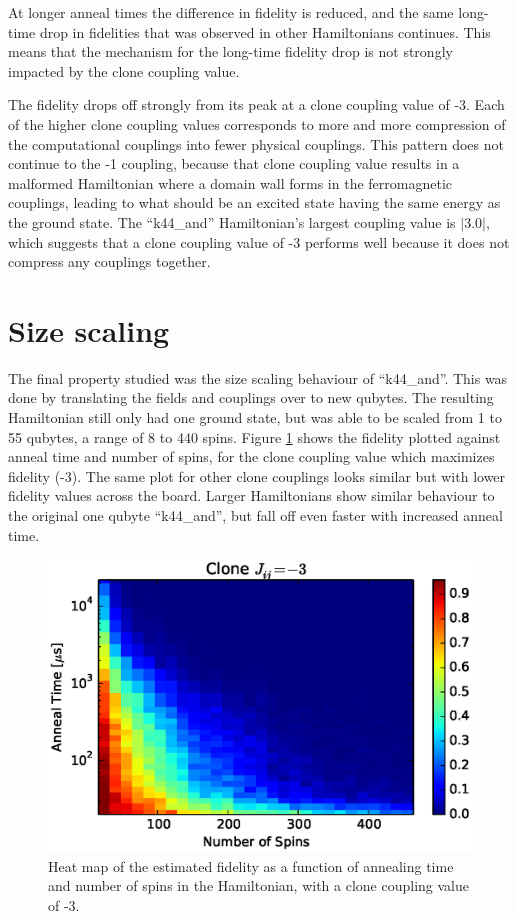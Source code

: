 At longer anneal times the difference in fidelity is reduced, and the same long-time drop in fidelities that was observed in other Hamiltonians continues.  This means that the mechanism for the long-time fidelity drop is not strongly impacted by the clone coupling value.

The fidelity drops off strongly from its peak at a clone coupling value of -3.  Each of the higher clone coupling values corresponds to more and more compression of the computational couplings into fewer physical couplings.  This pattern does not continue to the -1 coupling, because that clone coupling value results in a malformed Hamiltonian where a domain wall forms in the ferromagnetic couplings, leading to what should be an excited state having the same energy as the ground state.  The ``k44\_and'' Hamiltonian's largest coupling value is $|3.0|$, which suggests that a clone coupling value of -3 performs well because it does not compress any couplings together.

\section{Size scaling}
The final property studied was the size scaling behaviour of ``k44\_and''.  This was done by translating the fields and couplings over to new qubytes.  The resulting Hamiltonian still only had one ground state, but was able to be scaled from 1 to 55 qubytes, a range of 8 to 440 spins.  Figure \ref{fig:time_spins} shows the fidelity plotted against anneal time and number of spins, for the clone coupling value which maximizes fidelity (-3).  The same plot for other clone couplings looks similar but with lower fidelity values across the board.  Larger Hamiltonians show similar behaviour to the original one qubyte ``k44\_and'', but fall off even faster with increased anneal time.

\begin{figure}
	\includegraphics{img/pcolor_c_3.eps}
	\caption[Fidelity vs Time vs Number of Qubits]{Heat map of the estimated fidelity as a function of annealing time and number of spins in the Hamiltonian, with a clone coupling value of -3.}
	\label{fig:time_spins}
\end{figure}

